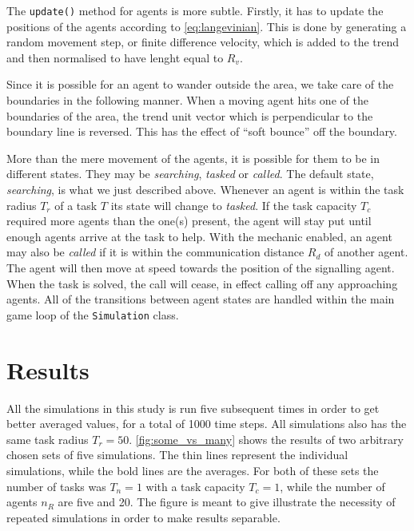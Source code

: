 \documentclass[11pt]{article}
\begin{document}
    The \lstinline!update()! method for agents is more subtle. Firstly, it has to 
    update the positions of the agents according to \autoref{eq:langevinian}. 
    This is done by generating a random movement step, or finite difference velocity,
    which is added to the trend and then normalised to have lenght equal to $R_v$.

    Since it is possible for an agent to wander outside the area, we take care of 
    the boundaries in the following manner. When a moving agent hits one of the
    boundaries of the area, the trend unit vector which is perpendicular to 
    the boundary line is reversed. This has the effect of ``soft bounce'' 
    off the boundary.

    More than the mere movement of the agents, it is possible for them to be in
    different states. They may be \emph{searching}, \emph{tasked} or \emph{called}.
    The default state, \emph{searching}, is what we just described above. Whenever
    an agent is within the task radius $T_r$ of a task $T$ its state will change 
    to \emph{tasked}. If the task capacity $T_c$ required more agents than the
    one(s) present, the agent will stay put until enough agents arrive at the 
    task to help. With the mechanic enabled, an agent may also be \emph{called}
    if it is within the communication distance $R_d$ of another agent. The agent 
    will then move at speed towards the position of the signalling agent. When the 
    task is solved, the call will cease, in effect calling off any approaching agents.
    All of the transitions between agent states are handled within the main game loop 
    of the \lstinline!Simulation! class.

    \section{Results}

    All the simulations in this study is run five subsequent times in order to 
    get better averaged values, for a total of 1000 time steps. All simulations 
    also has the same task radius $T_r=50$.
    \autoref{fig:some_vs_many} shows the results of two arbitrary chosen sets
    of five simulations. The thin lines represent 
    the individual simulations, while the bold lines are the averages. For 
    both of these sets the number of tasks was $T_n=1$ with a task capacity $T_c=1$,
    while the number of agents $n_R$ are five and 20. The figure is meant to give 
    illustrate the necessity of repeated simulations in order to make 
    results separable.
\end{document}
